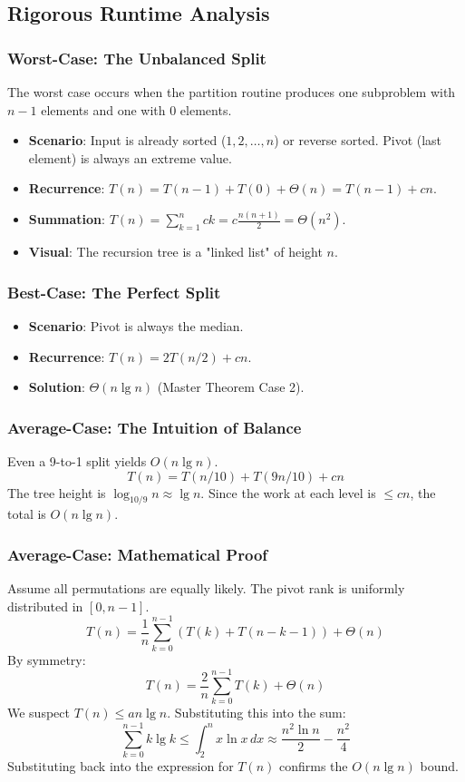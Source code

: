 \documentclass[12pt]{article}
\theoremstyle{blueplain}
\theoremstyle{bluedef}
\theoremstyle{blueremark}
\begin{document}
\subsection{Rigorous Runtime Analysis}

\subsubsection{Worst-Case: The Unbalanced Split}
The worst case occurs when the partition routine produces one subproblem with $n-1$ elements and one with 0 elements.
\begin{itemize}
    \item \textbf{Scenario}: Input is already sorted ($1, 2, \dots, n$) or reverse sorted. Pivot (last element) is always an extreme value.
    \item \textbf{Recurrence}: $T(n) = T(n-1) + T(0) + \Theta(n) = T(n-1) + cn$.
    \item \textbf{Summation}: $T(n) = \sum_{k=1}^n ck = c \frac{n(n+1)}{2} = \Theta(n^2)$.
    \item \textbf{Visual}: The recursion tree is a "linked list" of height $n$.
\end{itemize}

\subsubsection{Best-Case: The Perfect Split}
\begin{itemize}
    \item \textbf{Scenario}: Pivot is always the median.
    \item \textbf{Recurrence}: $T(n) = 2T(n/2) + cn$.
    \item \textbf{Solution}: $\Theta(n \lg n)$ (Master Theorem Case 2).
\end{itemize}

\subsubsection{Average-Case: The Intuition of Balance}
Even a 9-to-1 split yields $O(n \lg n)$.
\[ T(n) = T(n/10) + T(9n/10) + cn \]
The tree height is $\log_{10/9} n \approx \lg n$. Since the work at each level is $\le cn$, the total is $O(n \lg n)$.

\subsubsection{Average-Case: Mathematical Proof}
Assume all permutations are equally likely. The pivot rank is uniformly distributed in $[0, n-1]$.
\[
    T(n) = \frac{1}{n} \sum_{k=0}^{n-1} (T(k) + T(n-k-1)) + \Theta(n)
\]
By symmetry:
\[
    T(n) = \frac{2}{n} \sum_{k=0}^{n-1} T(k) + \Theta(n)
\]
We suspect $T(n) \le an \lg n$. Substituting this into the sum:
\[
    \sum_{k=0}^{n-1} k \lg k \le \int_2^n x \ln x \, dx \approx \frac{n^2 \ln n}{2} - \frac{n^2}{4}
\]
Substituting back into the expression for $T(n)$ confirms the $O(n \lg n)$ bound.
\end{document}
